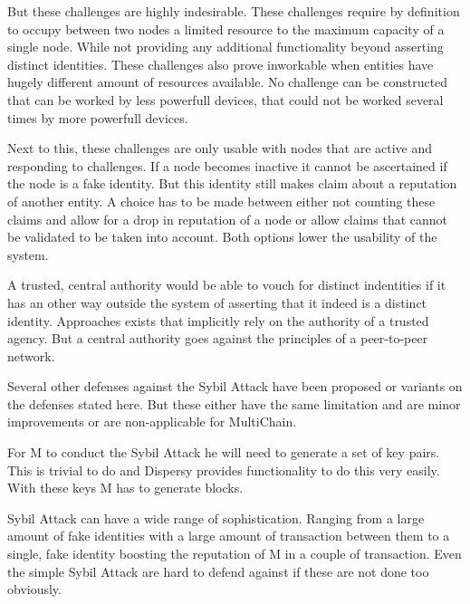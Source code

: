 But these challenges are highly indesirable.
These challenges require by definition to occupy between two nodes a limited resource to the maximum capacity of a single node.
While not providing any additional functionality beyond asserting distinct identities.
These challenges also prove inworkable when entities have hugely different amount of resources available.
No challenge can be constructed that can be worked by less powerfull devices,
that could not be worked several times by more powerfull devices.

Next to this, these challenges are only usable with nodes that are active and responding to challenges.
If a node becomes inactive it cannot be ascertained if the node is a fake identity.
But this identity still makes claim about a reputation of another entity.
A choice has to be made between either not counting these claims and allow for a drop in reputation of a node or
allow claims that cannot be validated to be taken into account.
Both options lower the usability of the system.

A trusted, central authority would be able to vouch for distinct indentities
if it has an other way outside the system of asserting that it indeed is a distinct identity.
Approaches exists that implicitly rely on the authority of a trusted agency.
But a central authority goes against the principles of a peer-to-peer network.

Several other defenses against the Sybil Attack have been proposed\cite{newsome-sybil}\cite{dinger-sybil}
or variants on the defenses stated here\cite{levine-sybilsurvey}.
But these either have the same limitation and are minor improvements or are non-applicable for MultiChain.

For M to conduct the Sybil Attack he will need to generate a set of key pairs.
This is trivial to do and Dispersy provides functionality to do this very easily.
With these keys M has to generate blocks.

Sybil Attack can have a wide range of sophistication.
Ranging from a large amount of fake identities with a large amount of transaction between them
to a single, fake identity boosting the reputation of M in a couple of transaction.
Even the simple Sybil Attack are hard to defend against if these are not done too obviously.